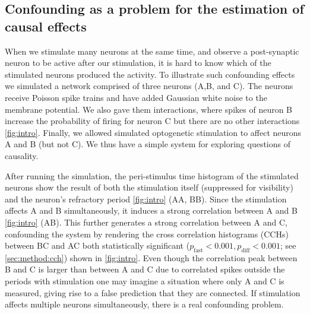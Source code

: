 \documentclass[11pt]{article}
\begin{document}
\subsection{Confounding as a problem for the estimation of causal effects}
When we stimulate many neurons at the same time, and observe a post-synaptic neuron to be active after our stimulation, it is hard to know which of the stimulated neurons produced the activity. To illustrate such confounding effects we simulated a network comprised of three neurons (A,B, and C). The neurons receive Poisson spike trains and have added Gaussian white noise to the membrane potential. We also gave them interactions, where spikes of neuron B increase the probability of firing for neuron C but there are no other interactions \cref{fig:intro}.
Finally, we allowed simulated optogenetic stimulation to affect neurons A and B (but not C). We thus have a simple system for exploring questions of causality.

After running the simulation, the peri-stimulus time histogram of the stimulated neurons show the result of both the stimulation itself (suppressed for visibility) and the neuron's refractory period \cref{fig:intro} (AA, BB).  Since the stimulation affects A and B simultaneously, it induces a strong correlation between A and B \cref{fig:intro} (AB). This further generates a strong correlation between A and C, confounding the system by rendering the cross correlation histograms (CCHs) between BC and AC both statistically significant ($ p_{\mathrm{fast}} < 0.001, p_{\mathrm{diff}} < 0.001 $; see \cref{sec:method:cch}) shown in \cref{fig:intro}. Even though the correlation peak between B and C is larger than between A and C due to correlated spikes outside the periods with stimulation one may imagine a situation where only A and C is measured, giving rise to a false prediction that they are connected. If stimulation affects multiple neurons simultaneously, there is a real confounding problem.
\end{document}
